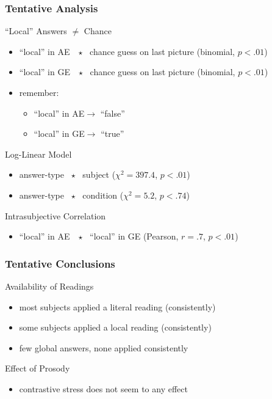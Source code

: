 \documentclass[fleqn,10pt,xcolor=dvipsnames]{beamer}
\renewcommand{\AE}{AE\xspace}
\newcommand{\GE}{GE\xspace}
\begin{document}
\begin{frame}
  \frametitle{Tentative Analysis}

  \begin{block}{``Local'' Answers $\neq$ Chance}
    \begin{itemize}
    \item ``local'' in \AE\ \ $\star$ \ chance guess on last picture
      \hfill (binomial, $p < .01$)
    \item ``local'' in \GE\ \ $\star$ \ chance guess on last picture
      \hfill (binomial, $p < .01$)
      \item remember:
        \begin{itemize}
        \item ``local'' in \AE $\rightarrow$ ``false''
        \item ``local'' in \GE $\rightarrow$ ``true''
        \end{itemize}
    \end{itemize}
  \end{block}

  
  \begin{block}{Log-Linear Model}
      \begin{itemize}
  \item answer-type \ $\star$ \ subject \hfill ($\chi^2
    =397.4$, $p < .01$)
  \item answer-type \ $\star$ \ condition \hfill ($\chi^2
    = 5.2$, $p < .74$)
  \end{itemize}
  \end{block}

    \begin{block}{Intrasubjective Correlation}
    \begin{itemize}
    \item ``local'' in \AE\ \ $\star$ \  ``local'' in \GE \hfill
      (Pearson, $r = .7$, $p < .01$)
    \end{itemize}
  \end{block}

\end{frame}


\begin{frame}
  \frametitle{Tentative Conclusions}
  
  \begin{block}{Availability of Readings}
    \begin{itemize}
    \item most subjects applied a literal reading (consistently)
    \item some subjects applied a local reading (consistently)
    \item few global answers, none applied consistently
    \end{itemize}
  \end{block}

  \begin{block}{Effect of Prosody}
    \begin{itemize}
    \item contrastive stress does not seem to any effect
    \end{itemize}
  \end{block}

\end{frame}
\end{document}
